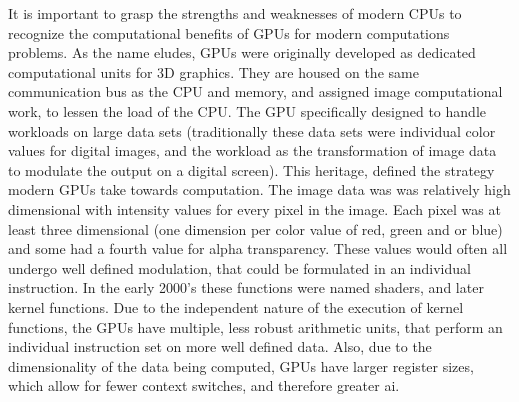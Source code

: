 It is important to grasp the strengths and weaknesses of modern \Glspl{CPU} to
recognize the computational benefits of \Glspl{GPU}
for modern computations problems.  As the name eludes, \Glspl{GPU} were originally developed
as dedicated computational units for 3D graphics\cite{Sanders}.  They are housed on the same
communication bus as the \Gls{CPU} and memory, and assigned image computational work,
to lessen the load of the CPU. %
The GPU specifically designed to handle workloads on large data sets (traditionally these
data sets were individual color values for digital images, and the workload as
the transformation of image data to modulate the output on a digital screen).
This heritage,
defined the strategy modern GPUs take towards computation.
The image data was was relatively high dimensional with intensity values for every pixel in the image.
Each pixel was at least three dimensional (one dimension per color value of red, green and or blue) and
some had a fourth value for alpha transparency.\cite{?}  These values would often all undergo
well defined modulation, that could be formulated in an individual instruction.
In the early 2000's these functions were named shaders, and later kernel functions.\cite{?}
Due to the independent nature of the execution of kernel functions, the GPUs have multiple, less robust
arithmetic units, that perform an individual instruction set on more well defined data.
Also, due to the dimensionality of the data being computed, \Glspl{GPU} have larger register\cite{?} sizes,
which allow for fewer context switches, and therefore greater \gls{ai}.

